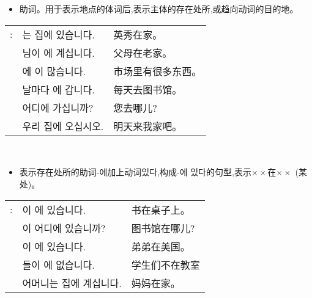 \section{\kr{}}
\begin{grammar}
    \begin{grammarsect}[\kr -에]
        \begin{itemize}
            \item 助词。用于表示地点的体词后,表示主体的存在处所,或趋向动词的目的地。
        \end{itemize}
        \begin{tabular}{lll}
            \kr\ruby{例}{예}:& \kr\ruby{英秀}{영수}는 집에 있습니다.&英秀在家。\\
            &\kr\ruby{父母}{부모}님이 \ruby{故鄉}{고향}에 계십니다.&父母在老家。\\
            &\kr\ruby{市場}{시장}에 \ruby{物件}{물건}이 많습니다.&市场里有很多东西。\\
            &\kr 날마다 \ruby{圖書館}{도서관}에 갑니다.&每天去图书馆。\\
            &\kr 어디에 가십니까?&您去哪儿?\\
            &\kr\ruby{來日}{내일} 우리 집에 오십시오.&明天来我家吧。
        \end{tabular}\\
        \begin{itemize}
            \item 表示存在处所的助词{\kr-에}加上动词{\kr 있다},构成{\kr -에 있다}的句型,表示$\times \times$在$\times \times$ (某处)。
        \end{itemize}
        \begin{tabular}{lll}
            \kr \ruby{例}{예}:&\kr \ruby{冊}{책}이 \ruby{冊床}{책상}에 있습니다.&书在桌子上。\\ 
            &\kr \ruby{圖書館}{도서관}이 어디에 있습니까?&图书馆在哪儿?\\
            &\kr \ruby{同生}{동생}이 \ruby{美國}{미국}에 있습니다.&弟弟在美国。\\
            &\kr \ruby{學生}{학생}들이 \ruby{教室}{교실}에 없습니다.&学生们不在教室\\
            &\kr 어머니는 집에 계십니다.&妈妈在家。\\
        \end{tabular}\\
    \end{grammarsect}
    \begin{grammarsect}[\kr 여기, 거기, 저기]
        \begin{itemize}

\end{itemize}
\end{grammarsect}
\end{grammar}
